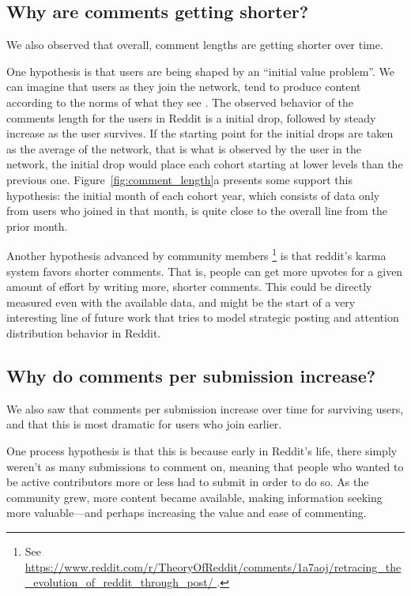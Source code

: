 \subsection{Why are comments getting shorter?}

We also observed that overall, comment lengths are getting shorter over time.  

One hypothesis is that users are being shaped by an ``initial value problem''. We can imagine that users as they join the network, tend to produce content according to the norms of what they see \cite{Kooti2010, Danescu-niculescu-mizil2013}.  The observed behavior of the comments length for the users in Reddit is a initial drop, followed by steady increase as the user survives. If the starting point for the initial drops are taken as the average of the network, that is what is observed by the user in the network, the initial drop would place each cohort starting at lower levels than the previous one.  Figure~\ref{fig:comment_length}a presents some support this hypothesis: the initial month of each cohort year, which consists of data only from users who joined in that month, is quite close to the overall line from the prior month.  

Another hypothesis advanced by community members \footnote{See \url{ https://www.reddit.com/r/TheoryOfReddit/comments/1a7aoj/retracing_the_evolution_of_reddit_through_post/  }.} is that reddit's karma system favors shorter comments.  That is, people can get more upvotes for a given amount of effort by writing more, shorter comments.  This could be directly measured even with the available data, and might be the start of a very interesting line of future work that tries to model strategic posting and attention distribution behavior in Reddit. 

\subsection{Why do comments per submission increase?}

We also saw that comments per submission increase over time for surviving users, and that this is most dramatic for users who join earlier.

One process hypothesis is that this is because early in Reddit's life, there simply weren't as many submissions to comment on, meaning that people who wanted to be active contributors more or less had to submit in order to do so.  
As the community grew, more content became available, making information seeking more valuable---and perhaps increasing the value and ease of commenting. 

